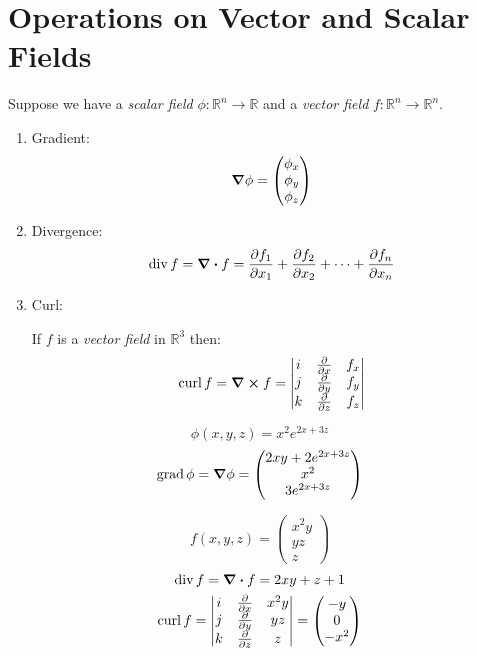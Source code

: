 \documentclass[00_complete]{subfiles}
\begin{document}
\section{Operations on Vector and Scalar Fields}
Suppose we have a \emph{scalar field} $\phi:\mathbb{R}^n \to \mathbb{R}$ and
a \emph{vector field} $f:\mathbb{R}^n\to \mathbb{R}^n$.
\begin{enumerate}
    \item Gradient:
        $$\grad \phi = \begin{pmatrix}
        \phi_x \\ \phi_y \\ \phi_z
    \end{pmatrix}$$
    \item Divergence:
        $$\operatorname{div} f = \div f= \pdv{f_1}{x_1}+\pdv{f_2}{x_2} + \dots + \pdv{f_n}{x_n}$$
    \item Curl:

        If $f$ is a \emph{vector field} in $\mathbb{R}^3$ then:
        $$\operatorname{curl} f = \curl f = \begin{vmatrix}
            i & \pdv{x} & f_x \\
            j & \pdv{y} & f_y \\
            k & \pdv{z} & f_z
        \end{vmatrix}$$
\end{enumerate}
\begin{example}
    $$\phi(x,y,z)=x^2e^{2x+3z}$$
    \begin{gather*}
        \operatorname{grad} \phi = \grad \phi = \begin{pmatrix}
        2xy + 2e^{2x+3z} \\
        x^2 \\
        3e^{2x+3z}
        \end{pmatrix}
    \end{gather*}
\end{example}
\begin{example}
    $$f(x,y,z)=\begin{pmatrix}
        x^2y \\ yz \\ z
    \end{pmatrix}$$
    \begin{gather*}
        \operatorname{div} f = \div f = 2xy + z + 1 \\
        \operatorname{curl} f = \begin{vmatrix}
            i & \pdv{x} & x^2y \\
            j & \pdv{y} & yz \\
            k & \pdv{z} & z
        \end{vmatrix} = \begin{pmatrix}
            -y \\ 0 \\ -x^2
        \end{pmatrix}
    \end{gather*}
\end{example}
\end{document}
